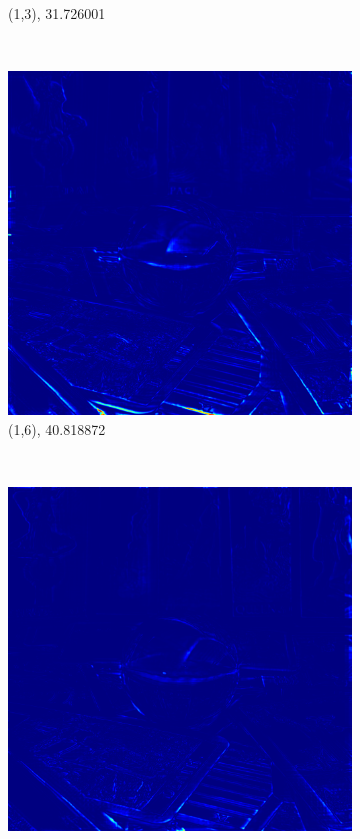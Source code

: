 \documentclass[11pt,a4paper,titlepage]{article}
\begin{document}
\begin{figure}
\begin{subfigure}[t]{0.3\textwidth}
		\caption{(1,3), 31.726001}
	\end{subfigure}%
	~
	\begin{subfigure}[t]{0.3\textwidth}
		\includegraphics[width=\textwidth]{results/tile_blending/tarot6x6x512x512-512x512x5-sampling=2x_tileRes=200x200_overlap=0.5/MSE_for_view_(1,6).png} 
		\caption{(1,6), 40.818872}
	\end{subfigure}%
	\\
	\begin{subfigure}[t]{0.3\textwidth}
		\includegraphics[width=\textwidth]{results/tile_blending/tarot6x6x512x512-512x512x5-sampling=2x_tileRes=200x200_overlap=0.5/MSE_for_view_(3,1).png}

\end{subfigure}
\end{figure}
\end{document}
